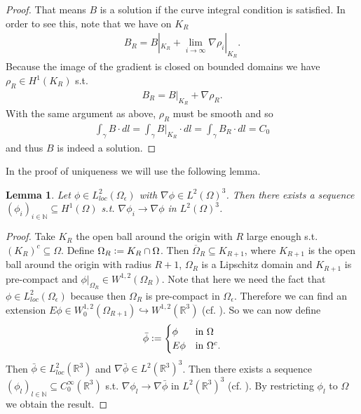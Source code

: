 \documentclass[12pt,a4paper]{article}
\numberwithin{equation}{subsection}
\newtheorem{lemma}{Lemma}[section]
\numberwithin{lemma}{subsection}
\theoremstyle{definition}
\newcommand{\naturalnum}{\mathbb{N}}
\newcommand{\real}{\mathbb{R}}
\begin{document}
\begin{proof}
    That means $B$ is a solution if the curve integral condition is satisfied.
    In order to see this, note that we have on $K_R$
    \begin{align*}
        B_R = B|_{K_R} +\lim\limits_{i\rightarrow \infty}\nabla \rho_i|_{K_R}.
    \end{align*}
    Because the image of the gradient is closed on bounded domains 
    we have $\rho_R \in H^1(K_R)$ s.t.
    \begin{align*}
        B_R = B|_{K_R} + \nabla \rho_R.
    \end{align*}
    With the same argument as above, $\rho_R$ must be smooth and so
    \begin{align*}
        \int_\gamma B \cdot dl =  \int_\gamma B|_{K_R} \cdot dl 
        =  \int_\gamma B_R \cdot dl = C_0
    \end{align*}
    and thus $B$ is indeed a solution.
\end{proof}

In the proof of uniqueness we will use the following lemma. 
\begin{lemma}\label{lem:gradient_sequence}
    Let $\phi \in L^2_{loc}(\Omega_\epsilon)$ 
    with $\nabla \phi \in L^2(\Omega)^3$. Then 
    there exists a sequence $(\phi_i)_{i \in \naturalnum} \subseteq H^1(\Omega)$
    s.t. $\nabla \phi_i \rightarrow \nabla \phi$ in $L^2(\Omega)^3$.
\end{lemma}
\begin{proof}
    Take $K_R$ the open ball around the origin with $R$ large enough 
    s.t. $(K_R)^c \subseteq \Omega$. 
    Define $\Omega_R \vcentcolon= K_R \cap \Omega$. Then 
    $\overline{\Omega}_R \subseteq K_{R+1}$, where $K_{R+1}$ is the open ball 
    around the origin with radius $R+1$, $\Omega_R$ is a Lipschitz 
    domain and $K_{R+1}$ is pre-compact and
    $\phi|_{\Omega_R} \in W^{1,2}(\Omega_R)$. 
    Note that here we need the fact that $\phi \in L^2_{loc}(\Omega_\epsilon)$
    because then $\Omega_R$ is pre-compact in $\Omega_\epsilon$. 
    Therefore we can find an extension
    $E\phi \in W_0^{1,2}(\Omega_{R+1}) \hookrightarrow W^{1,2}(\mathbb{R}^3)$
    (cf. \cite[Sec.\,1.5.1]{mazya}). So we can now define
    \begin{align*}
    \bar{\phi} \vcentcolon=
    \begin{cases}
        \phi & \mbox{in $\Omega$}\\
        E\phi & \mbox{in $\Omega^c$.}\\
    \end{cases}
    \end{align*}
    Then $\bar{\phi} \in L^2_{loc}(\real^3)$ and 
    $\nabla \bar{\phi} \in L^2(\real^3)^3$. 
    Then there exists a sequence 
    $(\phi_l) _{l \in \naturalnum} \subseteq C^\infty_0(\real^3)$ s.t.
    $\nabla \phi_l \rightarrow \nabla \bar{\phi}$ in $L^2(\real^3)^3$ 
    (cf. \cite[Lemma 1.1]{simader}). By restricting $\phi_l$ to $\Omega$ 
    we obtain the result.
\end{proof}
\end{document}
